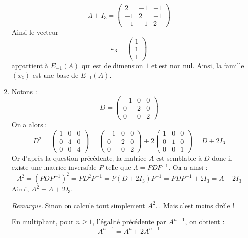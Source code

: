 \documentclass[a4paper,10pt]{report}
\begin{document}
\begin{enumerate}
$$ A+I_3  = \left(\begin{array}{ccc}
2 & -1 & -1\\
-1 & 2 & -1\\
-1 & -1 & 2
\end{array}\right)$$
Ainsi le vecteur 
$$ x_3 = \begin{pmatrix}
1 \\
1 \\
1
\end{pmatrix}$$
appartient à $E_{-1}(A)$ qui est de dimension $1$ et est non nul. Ainsi, la famille $(x_3)$ est une base de $E_{-1}(A)$.
\item Notons :
 \[D = \left( {\begin{array}{*{20}{c}}
{ - 1}&0&0\\
0&2&0\\
0&0&2
\end{array}} \right)\]
On a alors :
 \[{D^2} = \left( {\begin{array}{*{20}{c}}
1&0&0\\
0&4&0\\
0&0&4
\end{array}} \right) = \left( {\begin{array}{*{20}{c}}
{ - 1}&0&0\\
0&2&0\\
0&0&2
\end{array}} \right) + 2\left( {\begin{array}{*{20}{c}}
1&0&0\\
0&1&0\\
0&0&1
\end{array}} \right) = D +2 {I_3}\]
Or d'après la question précédente, la matrice $A$ est semblable à $D$ donc il existe une matrice inversible $P$ telle que $A=PDP^{-1}$. On a ainsi :
$$ A^2 = (PDP^{-1})^2 = PD^2P^{-1} = P(D+2I_3)P^{-1} = PDP^{-1} + 2I_3 = A+2 I_3$$
Ainsi, $A^2 = A + 2 I_3$. 

\medskip

\noindent \textit{Remarque}. Sinon on calcule tout simplement $A^2$... Mais c'est moins drôle !

\medskip

\noindent En multipliant, pour $n \geq 1$, l'égalité précédente par $A^{n-1}$, on obtient :
$$A^{n+1} = A^{n} + 2 A^{n-1}$$


\end{enumerate}
\end{document}
